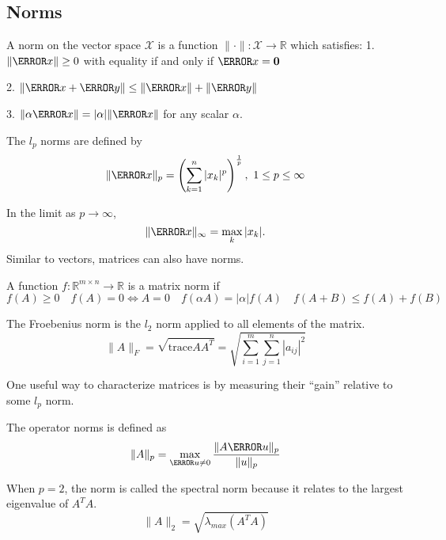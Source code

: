 \subsection{Norms}
\begin{definition}
  A norm on the vector space $\mathcal{X}$ is a function $\|\cdot\|:\mathcal{X}\rightarrow\mathbb{R}$ which satisfies:
	1. $\|\V{x}\|\geq 0$ with equality if and only if $\V{x}=\bs{0}$

	2. $\|\V{x}+\V{y}\|\leq\|\V{x}\|+\|\V{y}\|$

	3. $\|\alpha \V{x}\| = |\alpha|\|\V{x}\|$ for any scalar $\alpha$.
  \label{defn:norm}
\end{definition}
\begin{definition}
  The $l_p$ norms are defined by
  \[
		\|\V{x}\|_p=\left( \sum_{k=1}^n|x_k|^p \right)^{\frac{1}{p}},\ 1\leq p\leq \infty
  \]
  \label{defn:lp-norm}
\end{definition}
In the limit as $p\to\infty$, \[
	\|\V{x}\|_{\infty} = \max_k|x_k|.
\]
Similar to vectors, matrices can also have norms.
\begin{definition}
  A function $f: \mathbb{R}^{m\times n} \to \mathbb{R}$ is a matrix norm if 
  \[
		f(A) \geq 0 \quad f(A) = 0 \Leftrightarrow A = 0 \quad f(\alpha A) = |\alpha| f(A) \quad f(A+B) \leq f(A) + f(B)
  \]
  \label{defn:matrix-norm}
\end{definition}
\begin{definition}
  The Froebenius norm is the $l_2$ norm applied to all elements of the matrix.
  \[
	\|A\|_F = \sqrt{\text{trace} AA^T} = \sqrt{\sum_{i=1}^m \sum_{j=1}^n |a_{ij}|^2}
  \]
  \label{defn:froebenius-norm}
\end{definition}
One useful way to characterize matrices is by measuring their ``gain'' relative to some $l_p$ norm.
\begin{definition}
  The operator norms is defined as
  \[
	\|A\|_p = \max_{\V{u}\ne0} \frac{\|A\V{u}\|_p}{\|u\|_p}
  \]
  \label{defn:operator-norm}
\end{definition}
When $p=2$, the norm is called the spectral norm because it relates to the largest eigenvalue of $A^TA$.
\[
	\|A\|_2 = \sqrt{\lambda_{max}(A^TA)}
\]
